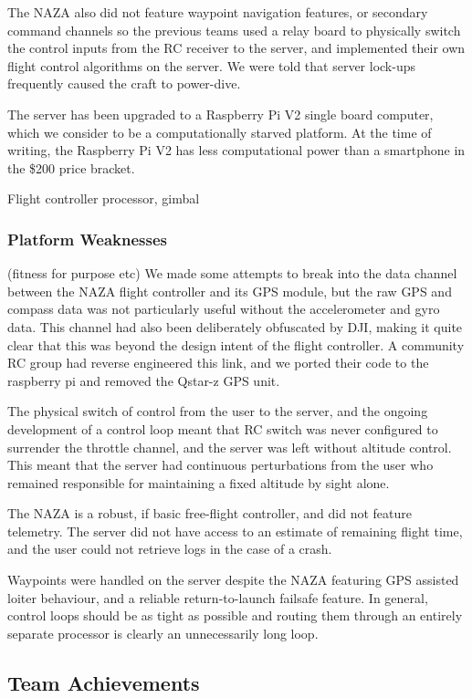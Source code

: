 \documentclass[a4paper, 11pt, titlepage]{article}
\begin{document}
      The NAZA also did not feature waypoint navigation features, or secondary command channels so the previous teams used a relay board to physically switch the control inputs from the RC receiver to the server, and implemented their own flight control algorithms on the server.  We were told that server lock-ups frequently caused the craft to power-dive.
      
      The server has been upgraded to a Raspberry Pi V2 single board computer, which we consider to be a computationally starved platform.  At the time of writing, the Raspberry Pi V2 has less computational power than a smartphone in the \$200 price bracket.

      Flight controller
       processor, gimbal
    \subsubsection{Platform Weaknesses}
      (fitness for purpose etc)
      We made some attempts to break into the data channel between the NAZA flight controller and its GPS module, but the raw GPS and compass data was not particularly useful without the accelerometer and gyro data.  This channel had also been deliberately obfuscated by DJI, making it quite clear that this was beyond the design intent of the flight controller.  A community RC group had reverse engineered this link, and we ported their code to the raspberry pi and removed the Qstar-z GPS unit.
      
      The physical switch of control from the user to the server, and the ongoing development of a control loop meant that RC switch was never configured to surrender the throttle channel, and the server was left without altitude control.  This meant that the server had continuous perturbations from the user who remained responsible for maintaining a fixed altitude by sight alone.

      The NAZA is a robust, if basic free-flight controller, and did not feature telemetry.  The server did not have access to an estimate of remaining flight time, and the user could not retrieve logs in the case of a crash.

      Waypoints were handled on the server despite the NAZA featuring GPS assisted loiter behaviour, and a reliable return-to-launch failsafe feature.  In general, control loops should be as tight as possible and routing them through an entirely separate processor is clearly an unnecessarily long loop.


  \subsection{Team Achievements}
\end{document}
